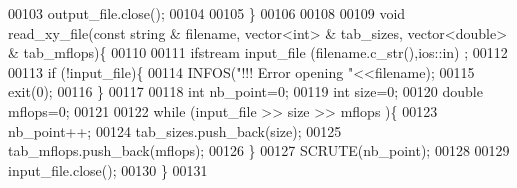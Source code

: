 \begin{DoxyCode}
00103   output\_file.close();
00104 
00105 \}
00106 
00108 
00109 \textcolor{keywordtype}{void} read\_xy\_file(\textcolor{keyword}{const} \textcolor{keywordtype}{string} & filename, vector<int> & tab\_sizes, vector<double> & tab\_mflops)\{
00110 
00111   ifstream input\_file (filename.c\_str(),ios::in) ;
00112 
00113   \textcolor{keywordflow}{if} (!input\_file)\{
00114     INFOS(\textcolor{stringliteral}{"!!! Error opening "}<<filename);
00115     exit(0);
00116   \}
00117   
00118   \textcolor{keywordtype}{int} nb\_point=0;
00119   \textcolor{keywordtype}{int} size=0;
00120   \textcolor{keywordtype}{double} mflops=0;
00121 
00122   \textcolor{keywordflow}{while} (input\_file >> size >> mflops )\{
00123     nb\_point++;
00124     tab\_sizes.push\_back(size);
00125     tab\_mflops.push\_back(mflops);
00126   \}
00127   SCRUTE(nb\_point);
00128 
00129   input\_file.close();
00130 \}
00131 
\end{DoxyCode}

